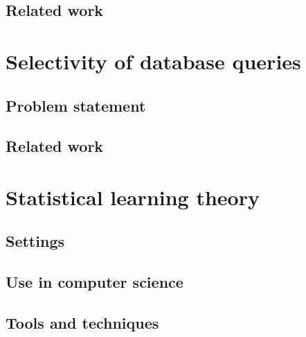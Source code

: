 \subsection{Related work}

\section{Selectivity of database queries}
\subsection{Problem statement}
\subsection{Related work}

\section{Statistical learning theory}
\subsection{Settings}
\subsection{Use in computer science}
\subsection{Tools and techniques}

